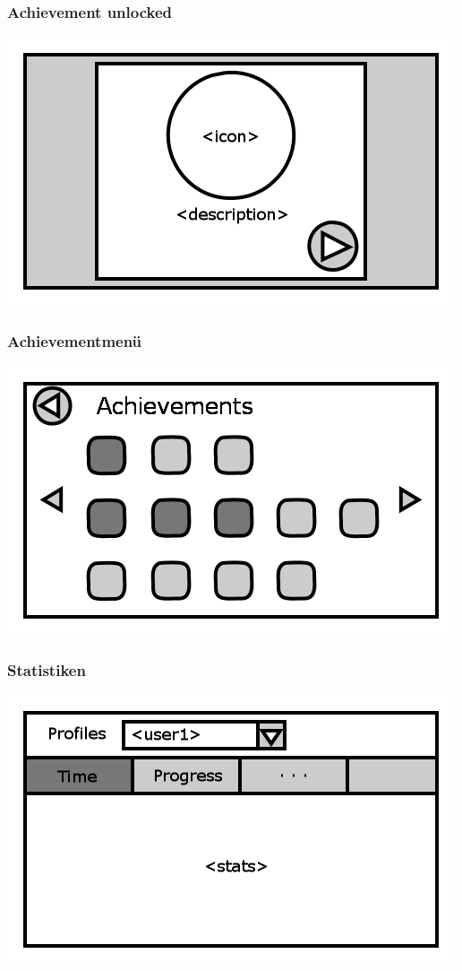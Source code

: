 \documentclass[t]{beamer}
\begin{document}
\begin{frame}
	\frametitle{Achievement unlocked}
	\includegraphics[height=\textheight]{achievement_notification.png}
\end{frame}
\begin{frame}
	\frametitle{Achievementmenü}
	\includegraphics[height=\textheight]{achievements.png}
\end{frame}
\begin{frame}
	\frametitle{Statistiken}
	\includegraphics[height=\textheight]{stats.png}
\end{frame}
\end{document}
